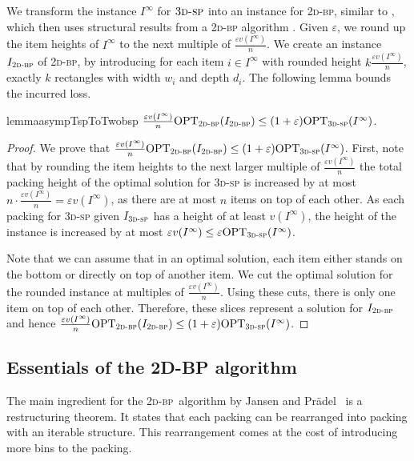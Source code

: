 \documentclass[a4paper,UKenglish,cleveref, autoref, thm-restate]{lipics-v2021}
\newcommand{\eps}{\varepsilon}
\newcommand{\opt}{\mathrm{OPT}}
\newcommand{\twobp}{\textsc{2d-bp}\xspace}
\newcommand{\tsp}{\textsc{3d-sp}\xspace}
\begin{document}
We transform the instance $I^{\infty}$ for $\tsp$ into an instance for \twobp, similar to \cite{3d-strip-packing}, which then uses structural results from a {\twobp} algorithm \cite{jansen2016new}.
Given $\eps$, we round up the item heights of $I^{\infty}$  to the next multiple of $\frac{\eps v(I^{\infty})}{n}$.
We create an instance $I_{\twobp}$ of \twobp, by introducing for each item $i \in I^{\infty}$ with rounded height $k \frac{\eps v(I^{\infty})}{n}$, exactly $k$ rectangles with width $w_i$ and depth $d_i$. The following lemma bounds the incurred loss. 

\begin{restatable}{lemma}{asympTspToTwobsp}
\label{lem:asymp-tsp-to-twobsp}
$\frac{\eps v(I^{\infty})}{ n} \opt_{\twobp}(I_{\twobp})\leq (1+\eps)\opt_{\tsp}(I^{\infty})$.
\end{restatable}

\begin{proof}
We prove that $\frac{\eps v(I^{\infty})}{ n} \opt_{\twobp}(I_{\twobp})\leq (1+\eps)\opt_{\tsp}(I^{\infty})$.
    First, note that by rounding the item heights to the next larger multiple of $\frac{\eps v(I^{\infty})}{n}$ the total packing height of the optimal solution for \tsp is increased by at most $n \cdot \frac{\eps v(I^{\infty})}{n} = \eps v(I^{\infty})$, as there are at most $n$ items on top of each other.
    As each packing for \tsp given $I_{\tsp}$ has a height of at least $v(I^{\infty})$, the height of the instance is increased by at most $\eps v(I^{\infty}) \leq \eps\opt_{\tsp}(I^{\infty})$.

    Note that we can assume that in an optimal solution, each item either stands on the bottom or directly on top of another item. 
    We cut the optimal solution for the rounded instance at multiples of $\frac{\eps v(I^{\infty})}{n}$.
    Using these cuts, there is only one item on top of each other.
    Therefore, these slices represent a solution for $I_{\twobp}$ and hence $\frac{\eps v(I^{\infty})}{n} \opt_{\twobp}(I_{\twobp})\leq (1+\eps)\opt_{\tsp}(I^{\infty})$.
\end{proof}

\subsection{Essentials of the 2D-BP algorithm}
\label{subsec:2dbp}

The main ingredient for the \twobp~algorithm by Jansen and Prädel~\cite{jansen2016new} is a restructuring theorem.
It states that each packing can be rearranged into packing with an iterable structure. This rearrangement comes at the cost of introducing more bins to the packing.
\end{document}
